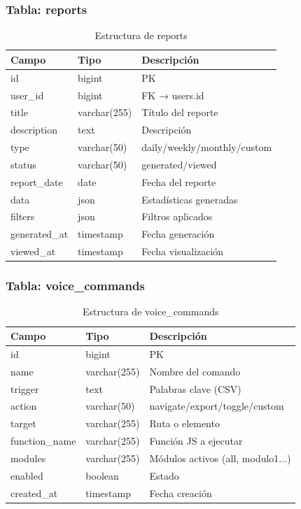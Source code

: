 \documentclass[12pt,a4paper]{article}
\begin{document}
\subsubsection{Tabla: reports}

\begin{table}[H]
\centering
\small
\begin{tabular}{|l|l|p{5cm}|}
\hline
\textbf{Campo} & \textbf{Tipo} & \textbf{Descripción} \\
\hline
id & bigint & PK \\
user\_id & bigint & FK → users.id \\
title & varchar(255) & Título del reporte \\
description & text & Descripción \\
type & varchar(50) & daily/weekly/monthly/custom \\
status & varchar(50) & generated/viewed \\
report\_date & date & Fecha del reporte \\
data & json & Estadísticas generadas \\
filters & json & Filtros aplicados \\
generated\_at & timestamp & Fecha generación \\
viewed\_at & timestamp & Fecha visualización \\
\hline
\end{tabular}
\caption{Estructura de reports}
\end{table}

\subsubsection{Tabla: voice\_commands}

\begin{table}[H]
\centering
\small
\begin{tabular}{|l|l|p{5cm}|}
\hline
\textbf{Campo} & \textbf{Tipo} & \textbf{Descripción} \\
\hline
id & bigint & PK \\
name & varchar(255) & Nombre del comando \\
trigger & text & Palabras clave (CSV) \\
action & varchar(50) & navigate/export/toggle/custom \\
target & varchar(255) & Ruta o elemento \\
function\_name & varchar(255) & Función JS a ejecutar \\
modules & varchar(255) & Módulos activos (all, modulo1...) \\
enabled & boolean & Estado \\
created\_at & timestamp & Fecha creación \\
\hline
\end{tabular}
\caption{Estructura de voice\_commands}
\end{table}
\end{document}
